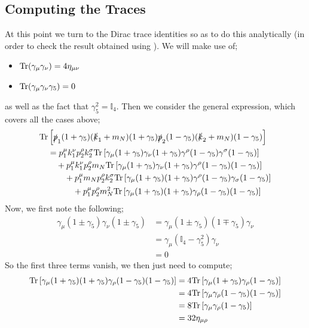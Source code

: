 \documentclass[10pt]{article}
\begin{document}
\subsection{Computing the Traces}
At this point we turn to the Dirac trace identities so as to do this analytically (in order to check the result obtained using \cite{Patel:2015tea}). We will make use of;
\begin{itemize}
\item $\text{Tr}(\gamma_{\mu}\gamma_{\nu}) = 4\eta_{\mu\nu}$
\item $\text{Tr}(\gamma_\mu \gamma_\nu \gamma_5) = 0$
\end{itemize}
as well as the fact that $\gamma_5^2 = \mathbb{I}_4$. Then we consider the general expression, which covers all the cases above;
\begin{align*}
&\text{Tr}\left[\slashed{p}_1(1 + \gamma_5)(\slashed{k}_1 + m_N)(1 + \gamma_5)\slashed{p}_2(1 - \gamma_5)(\slashed{k}_2 + m_N)(1 - \gamma_5)\right] \\
&\quad= p_1^{\mu}k_1^{\nu}p_2^{\rho}k_2^{\sigma}\text{Tr}\left[\gamma_\mu(1 + \gamma_5)\gamma_\nu(1 + \gamma_5)\gamma^{\rho}(1 - \gamma_5)\gamma^{\sigma}(1 - \gamma_5)\right] \\
&\qquad+ p_1^{\mu}k_1^{\nu}p_2^{\rho}m_N \text{Tr}\left[\gamma_\mu(1 + \gamma_5)\gamma_\nu(1 + \gamma_5)\gamma^{\rho}(1 - \gamma_5)(1 - \gamma_5)\right] \\
&\qquad \quad + p_1^{\mu}m_Np_2^{\rho}k_2^{\sigma} \text{Tr}\left[\gamma_\mu(1 + \gamma_5)(1 + \gamma_5)\gamma^{\rho}(1 - \gamma_5)\gamma_\sigma(1 - \gamma_5)\right] \\
&\qquad \qquad+ p_1^{\mu}p_2^{\rho}m_N^2 \text{Tr}\left[\gamma_\mu(1 + \gamma_5)(1 + \gamma_5)\gamma_\rho(1 - \gamma_5)(1 - \gamma_5)\right]
\end{align*}
Now, we first note the following;
\begin{align*}
\gamma_\mu (1 \pm \gamma_5)\gamma_\nu(1 \pm \gamma_5) &= \gamma_\mu(1 \pm \gamma_5)(1 \mp \gamma_5)\gamma_\nu \\
&= \gamma_\mu (\mathbb{I}_4 - \gamma_5^2)\gamma_\nu \\
&= 0
\end{align*}
So the first three terms vanish, we then just need to compute;
\begin{align*}
\text{Tr}\left[\gamma_\mu(1 + \gamma_5)(1 + \gamma_5)\gamma_\rho(1 - \gamma_5)(1 - \gamma_5)\right] &= 4\text{Tr}\left[\gamma_\mu(1 + \gamma_5)\gamma_\rho(1 - \gamma_5)\right] \\
&= 4\text{Tr}\left[\gamma_\mu \gamma_\rho (1 - \gamma_5)(1 - \gamma_5)\right] \\
&= 8\text{Tr}\left[\gamma_\mu \gamma_\rho (1 - \gamma_5)\right] \\
&= 32\eta_{\mu\rho}
\end{align*}
\end{document}
